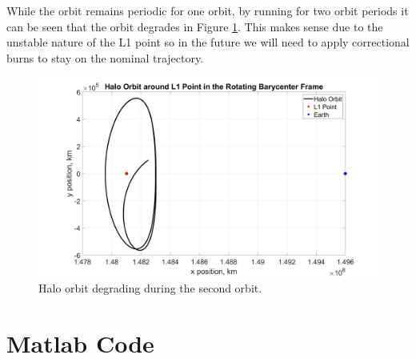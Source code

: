 \documentclass[12pt,a4paper,notitlepage]{article}
\begin{document}
While the orbit remains periodic for one orbit, by running for two orbit periods it can be seen that the orbit degrades in Figure \ref{fig:halo_2}. This makes sense due to the unstable nature of the L1 point so in the future we will need to apply correctional burns to stay on the nominal trajectory.

\begin{figure}[H]
  \centering
    \includegraphics[width=\textwidth]{Images/halorotating_2.jpg}
  \caption{Halo orbit degrading during the second orbit.}
  \label{fig:halo_2}
\end{figure}

\newpage
\printbibliography

\newpage
\appendix
\addappheadtotoc
\Large{\bf{\appendixname}}
\section{Matlab Code}
\end{document}
